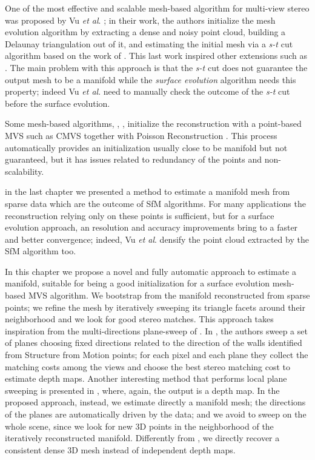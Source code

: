 One of the most effective and scalable mesh-based algorithm for multi-view stereo was proposed by Vu \emph{et al}. \cite{vu_et_al_2012}; in their work, the authors initialize the mesh evolution algorithm by extracting a dense and noisy point cloud, building a Delaunay triangulation out of it, and estimating the initial mesh via a \emph{s-t} cut algorithm based on the work of \cite{labatut2007efficient}. 
This last work inspired other extensions such as \cite{jancosek2011multi}.
The main problem with this approach is that the \emph{s-t} cut does not guarantee the output mesh to be a manifold while the \emph{surface evolution} algorithm needs this property; indeed Vu \emph{et al}.  need to manually check the outcome of the \emph{s-t} cut before the surface evolution.

Some mesh-based algorithms, \eg, \cite{pan2015automatic,li2015detail}, initialize the reconstruction with a point-based MVS such as CMVS \cite{fu10} together with Poisson Reconstruction \cite{kazhdan2006poisson}.
This process automatically provides an initialization usually close to be manifold but not guaranteed, but it has issues related to redundancy of the points and non-scalability.

in the last chapter we presented a method   to estimate a manifold mesh  from sparse data which are the outcome of SfM algorithms. 
For many applications the reconstruction relying only on these points is sufficient, but for a surface evolution approach, an resolution and accuracy improvements bring to a faster and better convergence; indeed, Vu \emph{et al}. \cite{vu_et_al_2012} densify the point cloud extracted by the SfM algorithm too.

In this chapter we propose a novel and fully automatic approach to estimate a manifold, suitable for being a good initialization for a surface evolution mesh-based MVS algorithm.
We bootstrap from the manifold reconstructed from sparse points; we refine the mesh by iteratively sweeping its triangle facets around their neighborhood and we look for good stereo matches.
This approach takes inspiration from the multi-directions plane-sweep of \cite{gallup2007real}.
In \cite{gallup2007real}, the authors sweep a set of planes choosing fixed directions related to the direction of the walls identified from Structure from Motion points; for each pixel and each plane they collect the matching costs among the views and choose the best stereo matching cost to estimate depth maps.
Another interesting method that performs local plane sweeping is presented in \cite{sinha2014efficient}, where, again, the output is a depth map.
In the proposed approach, instead, we estimate directly a manifold mesh; the directions of the planes are automatically driven by the data; and we avoid to sweep on the whole scene, since we look for new 3D points in the neighborhood of the iteratively reconstructed manifold. 
Differently from \cite{gallup2007real}, we directly recover a consistent dense 3D mesh instead of independent depth maps.

